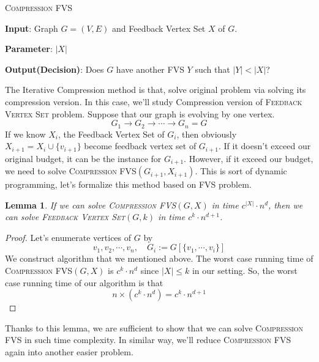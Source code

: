 \documentclass[12pt, a4paper, openany, twoside]{book}
\newtheorem{lem}[thm]{Lemma}
\theoremstyle{definition}
\theoremstyle{remark}
\theoremstyle{plain}
\numberwithin{equation}{section}
\begin{document}
\begin{tcolorbox}[colback=yellow!10!white,colframe=brown!75!black,title=Compression FVS]

\textsc{Compression FVS}

\textbf{Input}: Graph $G = (V, E)$ and Feedback Vertex Set $X$ of $G$.

\textbf{Parameter}: $|X|$

\textbf{Output(Decision)}: Does $G$ have another FVS $Y$ such that $|Y| < |X|$?

\end{tcolorbox}

The Iterative Compression method is that, solve original problem via solving its compression version. 
In this case, we'll study Compression version of \textsc{Feedback Vertex Set} problem.
Suppose that our graph is evolving by one vertex.
\[G_1 \rightarrow G_2 \rightarrow \cdots \rightarrow G_n = G\]
If we know $X_i$, the Feedback Vertex Set of $G_i$, then obviously $X_{i+1} = X_i \cup \{v_{i+1}\}$ become 
feedback vertex set of $G_{i+1}$. If it doesn't exceed our original budget, it can be the instance for $G_{i+1}$. 
However, if it exceed our budget, we need to solve \textsc{Compression FVS}$(G_{i+1}, X_{i+1})$. 
This is sort of dynamic programming, let's formalize this method based on FVS problem. 

\begin{lem}

If we can solve \textsc{Compression FVS}$(G, X)$ in time $c^{|X|} \cdot n^d$, then we can solve 
\textsc{Feedback Vertex Set}$(G, k)$ in time $c^k \cdot n^{d+1}$.

\end{lem}

\begin{proof}
    
Let's enumerate vertices of $G$ by 
\[v_1, v_2, \cdots, v_n, \quad G_i := G[\{v_1, \cdots, v_i\}]\]
We construct algorithm that we mentioned above. The worst case running time of \textsc{Compression FVS}$(G, X)$ is 
$c^k \cdot n^d$ since $|X| \leq k$ in our setting. So, the worst case running time of our algorithm is that 
\[n \times (c^k\cdot n^d) = c^k \cdot n^{d+1}\]

\end{proof}

Thanks to this lemma, we are sufficient to show that we can solve \textsc{Compression FVS} in such time complexity. 
In similar way, we'll reduce \textsc{Compression FVS} again into another easier problem. 
\end{document}
